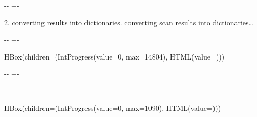 \documentclass[letterpaper,10pt,english]{sphinxmanual}
\newlength\nbsphinxcodecellspacing
\begin{document}
%
{
\kern-\sphinxverbatimsmallskipamount\kern-\baselineskip
\kern+\FrameHeightAdjust\kern-\fboxrule
\vspace{\nbsphinxcodecellspacing}
%
\begin{sphinxVerbatim}[commandchars=\\\{\}]

2. converting results into dictionaries.
converting scan results into dictionaries{\ldots}
\end{sphinxVerbatim}
}
\relax

{

\kern-\sphinxverbatimsmallskipamount\kern-\baselineskip
\kern+\FrameHeightAdjust\kern-\fboxrule
\vspace{\nbsphinxcodecellspacing}

%
\begin{sphinxVerbatim}[commandchars=\\\{\}]
HBox(children=(IntProgress(value=0, max=14804), HTML(value=\PYGZsq{}\PYGZsq{})))
\end{sphinxVerbatim}
}



%
{
\kern-\sphinxverbatimsmallskipamount\kern-\baselineskip
\kern+\FrameHeightAdjust\kern-\fboxrule
\vspace{\nbsphinxcodecellspacing}
%
\begin{sphinxVerbatim}[commandchars=\\\{\}]

\end{sphinxVerbatim}
}
\relax

{

\kern-\sphinxverbatimsmallskipamount\kern-\baselineskip
\kern+\FrameHeightAdjust\kern-\fboxrule
\vspace{\nbsphinxcodecellspacing}

%
\begin{sphinxVerbatim}[commandchars=\\\{\}]
HBox(children=(IntProgress(value=0, max=1090), HTML(value=\PYGZsq{}\PYGZsq{})))
\end{sphinxVerbatim}
}
\end{document}
